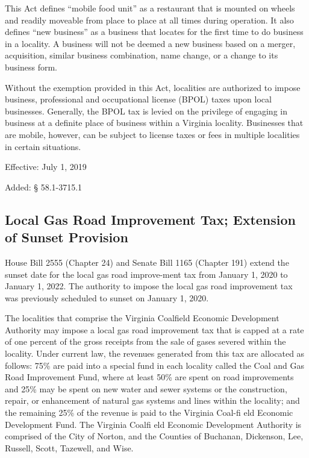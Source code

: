 \documentclass[
]{book}
\begin{document}
This Act defines ``mobile food unit'' as a restaurant that is mounted on wheels and readily moveable from place to place at all times during operation. It also defines ``new business'' as a business that locates for the first time to do business in a locality. A business will not be deemed a new business based on a merger, acquisition, similar business combination, name change, or a change to its business form.

Without the exemption provided in this Act, localities are authorized to impose business, professional and occupational license (BPOL) taxes upon local businesses. Generally, the BPOL tax is levied on the privilege of engaging in business at a definite place of business within a Virginia locality. Businesses that are mobile, however, can be subject to license taxes or fees in multiple localities in certain situations.

Effective: July 1, 2019

Added: § 58.1-3715.1

\hypertarget{local-gas-road-improvement-tax-extension-of-sunset-provision}{%
\subsection{Local Gas Road Improvement Tax; Extension of Sunset Provision}\label{local-gas-road-improvement-tax-extension-of-sunset-provision}}

House Bill 2555 (Chapter 24) and Senate Bill 1165 (Chapter 191) extend the sunset date for the local gas road improve-ment tax from January 1, 2020 to January 1, 2022. The authority to impose the local gas road improvement tax was previously scheduled to sunset on January 1, 2020.

The localities that comprise the Virginia Coalfield Economic Development Authority may impose a local gas road improvement tax that is capped at a rate of one percent of the gross receipts from the sale of gases severed within the locality. Under current law, the revenues generated from this tax are allocated as follows: 75\% are paid into a special fund in each locality called the Coal and Gas Road Improvement Fund, where at least 50\% are spent on road improvements and 25\% may be spent on new water and sewer systems or the construction, repair, or enhancement of natural gas systems and lines within the locality; and the remaining 25\% of the revenue is paid to the Virginia Coal-fi eld Economic Development Fund. The Virginia Coalfi eld Economic Development Authority is comprised of the City of Norton, and the Counties of Buchanan, Dickenson, Lee, Russell, Scott, Tazewell, and Wise.
\end{document}
